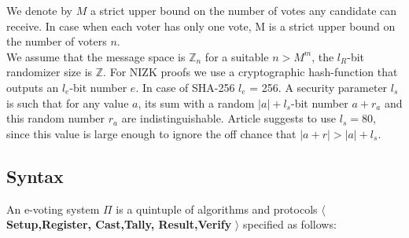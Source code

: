 \documentclass[12pt]{article}
\begin{document}
We denote by $M$ a strict upper bound on the number of votes any candidate can receive. In case when each voter has only one vote, M is a strict upper bound on the number of voters $n$.\\ 

We assume that the message space is $\mathbb{Z}_n$ for a suitable $n > M^m$, the $l_R$-bit randomizer size is  $\mathbb{Z}$. For NIZK proofs we use a cryptographic hash-function that outputs an $l_e$-bit number $e$. In case of SHA-256  $l_e$ = 256. A security parameter $l_s$ is such that for any value $a$, its sum with a random $|a| + l_s$-bit number $a + r_a$ and this random number $r_a$ are indistinguishable. Article \cite{Groth2005} suggests to use $l_s = 80$, since this value is large enough to ignore the off chance that $|a+r| > |a|+l_s$.

\subsection{Syntax}
An e-voting system $\Pi$ is a quintuple of algorithms and protocols $\langle$ \textbf{Setup,Register, Cast,Tally, Result,Verify} $\rangle$ specified as follows:
\end{document}
